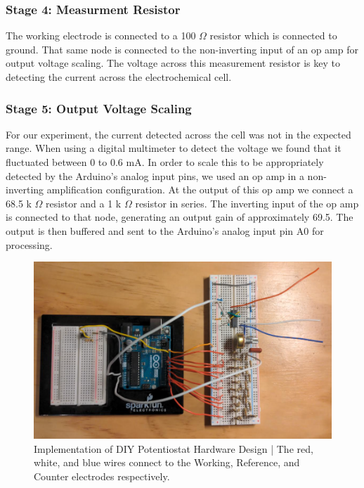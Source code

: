 \documentclass{article}
\begin{document}
\subsubsection*{Stage 4: Measurment Resistor}
The working electrode is connected to a 100 $\Omega$ resistor which is connected to ground. That same node is connected to the non-inverting input of an op amp for output voltage scaling. The voltage across this measurement resistor is key to detecting the current across the electrochemical cell.

\subsubsection*{Stage 5: Output Voltage Scaling}
For our experiment, the current detected across the cell was not in the expected range. When using a digital multimeter to detect the voltage we found that it fluctuated between 0 to 0.6 mA. In order to scale this to be appropriately detected by the Arduino's analog input pins, we used an op amp in a non-inverting amplification configuration. At the output of this op amp we connect a 68.5 k $\Omega$ resistor and a 1 k $\Omega$ resistor in series. The inverting input of the op amp is connected to that node, generating an output gain of approximately 69.5. The output is then buffered and sent to the Arduino's analog input pin A0 for processing.


\begin{figure}[H]
  \centering
  \includegraphics[width=1\linewidth]{hardware_design.png}
  \caption*{Implementation of DIY Potentiostat Hardware Design | The red, white, and blue wires connect to the Working, Reference, and Counter electrodes respectively.}
  \end{figure}

\newpage
\end{document}
